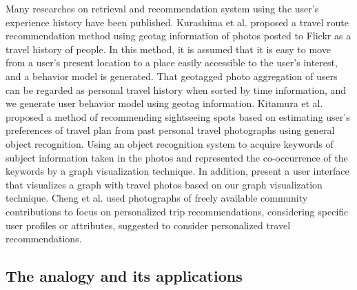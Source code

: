 \documentclass[journal]{IAENGtran}
\begin{document}
Many researches on retrieval and recommendation system using the user's experience history have been published.
Kurashima et al.\cite{Codd01} proposed a travel route recommendation method using geotag information of photos posted to Flickr as a travel history of people.
In this method, it is assumed that it is easy to move from a user's present location to a place easily accessible to the user's interest, and a behavior model is generated.
That geotagged photo aggregation of users can be regarded as personal travel history when sorted by time information, and we generate user behavior model using geotag information.
Kitamura et al.\cite{Codd02} proposed a method of recommending sightseeing spots based on estimating user's preferences of travel plan from past personal travel photographs using general object recognition.
Using an object recognition system to acquire keywords of subject information taken in the photos and represented the co-occurrence of the keywords by a graph visualization technique.
In addition, present a user interface that visualizes a graph with travel photos based on our graph visualization technique.
Cheng et al.\cite{Codd03} used photographs of freely available community contributions to focus on personalized trip recommendations, considering specific user profiles or attributes, suggested to consider personalized travel recommendations.

\subsection{The analogy and its applications}
\label{subsec:The analogy and its applications}
\end{document}
